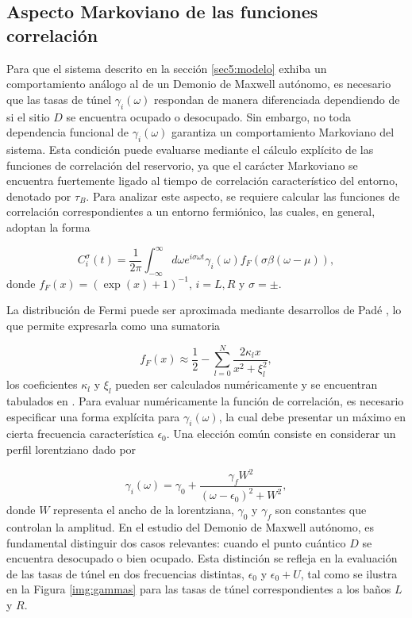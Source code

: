 \begin{appendixs}
\subsection{Aspecto Markoviano de las funciones correlación}
Para que el sistema descrito en la sección \ref{sec5:modelo} exhiba un comportamiento análogo al de un Demonio de Maxwell autónomo, es necesario que las tasas de túnel $\gamma_{i}(\omega)$ respondan de manera diferenciada dependiendo de si el sitio $D$ se encuentra ocupado o desocupado. Sin embargo, no toda dependencia funcional de $\gamma_{i}(\omega)$ garantiza un comportamiento Markoviano del sistema. Esta condición puede evaluarse mediante el cálculo explícito de las funciones de correlación del reservorio, ya que el carácter Markoviano se encuentra fuertemente ligado al tiempo de correlación característico del entorno, denotado por $\tau_{B}$. Para analizar este aspecto, se requiere calcular las funciones de correlación correspondientes a un entorno fermiónico, las cuales, en general, adoptan la forma

\begin{equation*}
    C^{\sigma}_{i}(t) = \frac{1}{2\pi} \int_{-\infty}^{\infty} d\omega e^{i\sigma \omega t} \gamma_{i}(\omega) f_{F}(\sigma \beta(\omega-\mu)),
\end{equation*}
donde $f_{F}(x) = (\exp(x)+1)^{-1}$, $i= L,R$ y $\sigma = \pm$. 

La distribución de Fermi puede ser aproximada mediante desarrollos de Padé \cite{hu2011pade,schinabeck2019hierarchical}, lo que permite expresarla como una sumatoria 

\begin{equation}
    f_{F}(x) \approx \frac{1}{2} - \sum_{l=0}^{N} \frac{ 2 \kappa_{l}x }{ x^{2} + \xi^{2}_{l} },
    \label{apendix5:pade}
\end{equation}
los coeficientes $\kappa_{l}$ y $\xi_{l}$ pueden ser calculados numéricamente y se encuentran tabulados en \cite{hu2011pade}. Para evaluar numéricamente la función de correlación, es necesario especificar una forma explícita para $\gamma_{i}(\omega)$, la cual debe presentar un máximo en cierta frecuencia característica $\epsilon_{0}$. Una elección común consiste en considerar un perfil lorentziano dado por

\begin{equation*}
    \gamma_{i}(\omega) = \gamma_{0} + \frac{\gamma_{f} W^{2}}{(\omega - \epsilon_{0})^{2} + W^{2}},
\end{equation*}
donde $W$ representa el ancho de la lorentziana, $\gamma_{0}$ y $\gamma_{f}$ son constantes que controlan la amplitud. En el estudio del Demonio de Maxwell autónomo, es fundamental distinguir dos casos relevantes: cuando el punto cuántico $D$ se encuentra desocupado o bien ocupado. Esta distinción se refleja en la evaluación de las tasas de túnel en dos frecuencias distintas, $\epsilon_{0}$ y $\epsilon_{0} + U$, tal como se ilustra en la Figura \ref{img:gammas} para las tasas de túnel correspondientes a los baños $L$ y $R$.


\end{appendixs}
